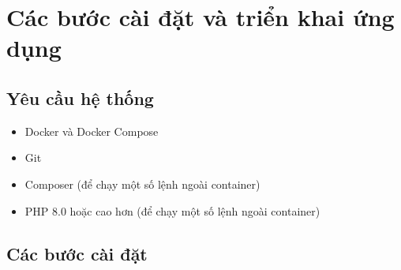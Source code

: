\documentclass[a4paper,12pt]{report}
\begin{document}
\section{Các bước cài đặt và triển khai ứng dụng}

\subsection{Yêu cầu hệ thống}

\begin{itemize}
    \item Docker và Docker Compose
    \item Git
    \item Composer (để chạy một số lệnh ngoài container)
    \item PHP 8.0 hoặc cao hơn (để chạy một số lệnh ngoài container)
\end{itemize}

\subsection{Các bước cài đặt}
\end{document}
